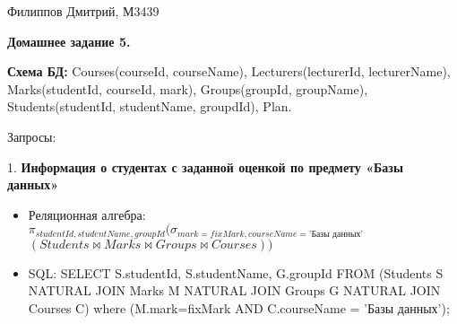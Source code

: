 \documentclass[11pt,a4paper,oneside]{article}
\begin{document}
\renewcommand{\t}[1]{\mbox{\texttt{#1}}}
\newcommand{\s}[1]{\mbox{``\t{#1}''}}
\newcommand{\eps}{\varepsilon}
\renewcommand{\phi}{\varphi}
\newcommand{\plainhat}{{\char 94}}

\newcommand{\Z}{\mathbb{Z}}
\newcommand{\w}[1]{``\t{#1}''}




Филиппов Дмитрий, М3439
\newline

\begin{LARGE} \textbf{Домашнее задание 5.} \end{LARGE}
\newline

\textbf{Схема БД:} Courses(courseId, courseName), Lecturers(lecturerId, lecturerName), Marks(studentId, courseId, mark), Groups(groupId, groupName), Students(studentId, studentName, groupdId), Plan.
\newline

Запросы:

1. \textbf{Информация о студентах с заданной оценкой по предмету «Базы данных»}

\begin{itemize}
\item Реляционная алгебра: $\pi_{studentId, studentName, groupId} (\sigma_{mark = fixMark, courseName = \mbox{'Базы данных'}}$ $(Students \bowtie Marks \bowtie Groups \bowtie Courses))$
\item SQL: SELECT S.studentId, S.studentName, G.groupId FROM (Students S NATURAL JOIN Marks M NATURAL JOIN Groups G NATURAL JOIN Courses C) where (M.mark=fixMark AND C.courseName = 'Базы данных');
\end{itemize}
\end{document}
